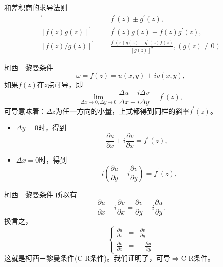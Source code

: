 \documentclass[11pt]{beamer}
\begin{document}
\begin{frame}{和差积商的求导法则}
\begin{eqnarray}
[f(z) \pm g(z)]^\prime &=& f^\prime(z) \pm g^\prime(z), \\
\left[f(z)g(z) \right]^\prime &=& f^\prime(z) g(z) + f(z) g^\prime(z), \\
\left[ f(z)/g(z) \right]^\prime &=& \frac{f^\prime(z) g(z) - g^\prime(z) f(z)}{ [g(z)]^2 }, (g(z) \neq 0)
\end{eqnarray}
\end{frame}

\begin{frame}{柯西－黎曼条件}
\begin{equation}
\omega = f(z) = u(x,y) + i v(x,y),
\end{equation}
如果$f(z)$在$z$点可导，即
\begin{equation}
\lim\limits_{\Delta x \rightarrow 0, \Delta y \rightarrow 0}
\frac{\Delta u + i \Delta v}{ \Delta x + i \Delta y } = f^\prime (z),
\end{equation}
可导意味着：$\Delta z$为任一方向的小量，上式都得到同样的斜率$f^\prime(z)$。
\begin{itemize}
	\item $\Delta y = 0$时，得到
			\begin{equation}
			\frac{\partial u}{\partial x} + i \frac{\partial v}{\partial x} = f^\prime (z),
			\end{equation}
	\item $\Delta x = 0$时，得到
			\begin{equation}
			-i(\frac{\partial u}{\partial y} + i \frac{\partial v}{\partial y}) = f^\prime (z),
			\end{equation}
\end{itemize}
\end{frame}

\begin{frame}{柯西－黎曼条件}
所以有
\begin{equation}
\frac{\partial u}{\partial x} + i \frac{\partial v}{\partial x} = \frac{\partial v}{\partial y} - i \frac{\partial u}{\partial y}.
\end{equation}
换言之，
\begin{equation}
\left\{
\begin{aligned}
\frac{\partial u}{\partial x} &=& \frac{\partial v}{\partial y} \\
\frac{\partial v}{\partial x} &=& - \frac{\partial u}{\partial y}
\end{aligned}
\right.
\end{equation}
这就是柯西－黎曼条件(C-R条件)。我们证明了，可导$\Rightarrow$C-R条件。
\end{frame}
\end{document}
